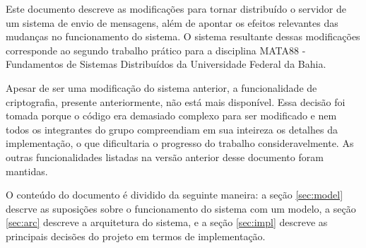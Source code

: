 \documentclass[../main.tex]{subfiles}
\begin{document}
Este documento descreve as modificações para tornar distribuído o servidor de um sistema de envio de mensagens, além de apontar os efeitos relevantes das mudanças no funcionamento do sistema.
O sistema resultante dessas modificações corresponde ao segundo trabalho prático para a disciplina MATA88 - Fundamentos de Sistemas Distribuídos da Universidade Federal da Bahia.

Apesar de ser uma modificação do sistema anterior, a funcionalidade de criptografia, presente anteriormente, não está mais disponível.
Essa decisão foi tomada porque o código era demasiado complexo para ser modificado e nem todos os integrantes do grupo compreendiam em sua inteireza os detalhes da implementação, o que dificultaria o progresso do trabalho consideravelmente.
As outras funcionalidades listadas na versão anterior desse documento foram mantidas.

O conteúdo do documento é dividido da seguinte maneira: a seção \ref{sec:model} descrve as suposições sobre o funcionamento do sistema com um modelo, a seção \ref{sec:arc} descreve a arquitetura do sistema, e a seção \ref{sec:impl} descreve as principais decisões do projeto em termos de implementação.
\end{document}
